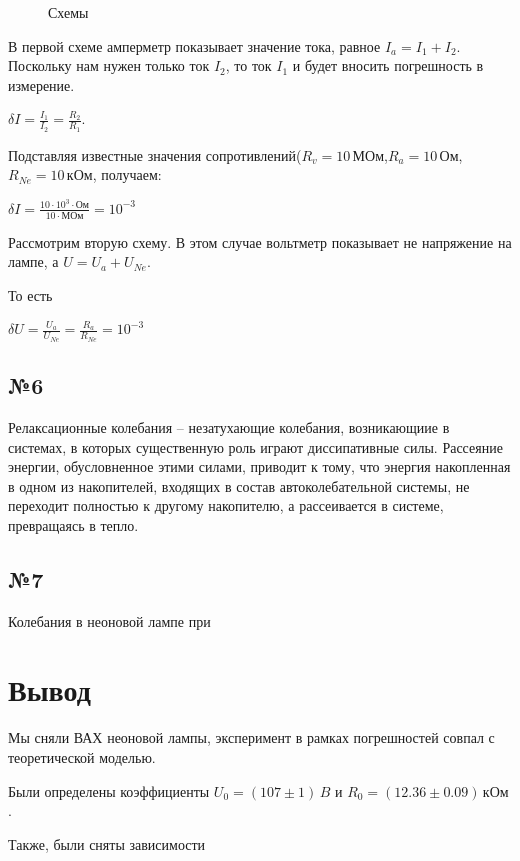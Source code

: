 \begin{figure}[H]
\begin{minipage}[H]{0.49\linewidth}
\end{minipage}
\caption{Схемы}
\end{figure}


В первой схеме амперметр показывает значение тока, равное $I_a=I_1+I_2$. Поскольку нам нужен только ток $I_2$, то ток $I_1$ и будет вносить погрешность в измерение. 
\begin{center}
$\delta I= \frac{I_1}{I_2}=\frac{R_2}{R_1}$. 
\end{center}
Подставляя известные значения сопротивлений($R_v=10\, \text{МОм}$,$R_a=10\, \text{Ом}$,$R_{Ne}=10 \,\text{кОм}$, получаем:
\begin{center}
$\delta I=\frac{10\cdot10^3\cdot\text{Ом}}{10\cdot \text{МОм}}=10^{-3}$
\end{center}
Рассмотрим вторую схему. В этом случае вольтметр  показывает не напряжение на лампе, а $U=U_a+U_{Ne}$.

То есть 

\begin{center}
$ \delta U =\frac{U_a}{U_{Ne}}=\frac{R_a}{R_{Ne}} = 10^{-3} $
\end{center}
\subsection{№6}
Релаксационные колебания -- незатухающие колебания, возникающиие в системах, в которых существенную роль играют диссипативные силы. Рассеяние энергии, обусловненное этими силами, приводит к тому, что энергия  накопленная в одном из накопителей, входящих в состав автоколебательной системы, не переходит полностью к другому накопителю, а рассеивается в системе, превращаясь в тепло.
\subsection{№7}
Колебания в неоновой лампе при 
\newpage
\section{Вывод}
Мы сняли ВАХ неоновой лампы, эксперимент в рамках погрешностей совпал с теоретической моделью. 

Были определены коэффициенты $U_0=(107\pm 1)\,B$ и $R_0=(12.36\pm 0.09)\,\text{кОм}$.

Также, были сняты зависимости 


